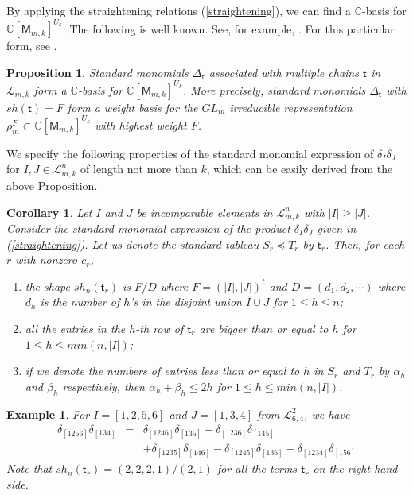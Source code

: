 \documentclass[11pt]{amsart}
\numberwithin{equation}{subsection}
\newtheorem{corollary}[theorem]{Corollary}
\newtheorem{example}[theorem]{Example}
\newtheorem{proposition}[theorem]{Proposition}
\begin{document}
By applying the straightening relations (\ref{straightening}), we can find a 
$\mathbb{C}$-basis for 
$\mathbb{C}[\mathsf{M}_{m,k}]^{U_{k}}$. The following is well known. See, for
example, \cite{BH93,DEP82,GL01,Hod43}. For this particular form, see 
\cite[Theorem 4.5, Remark 4.6]{Ki08}.

\begin{proposition}
Standard monomials $\Delta _{\mathsf{t}}$ associated with multiple chains 
$\mathsf{t}$ in $\mathcal{L}_{m,k}$ form a $\mathbb{C}$-basis for 
$\mathbb{C}[\mathsf{M}_{m,k}]^{U_{k}}$. More precisely, standard monomials 
$\Delta _{\mathsf{t}}$ with $sh(\mathsf{t})=F$ form a weight basis for the 
${GL}_{m}$ irreducible representation 
$\rho _{m}^{F}\subset \mathbb{C}[\mathsf{M}_{m,k}]^{U_{k}}$ with highest weight $F$.
\end{proposition}

\smallskip

We specify the following properties of the standard monomial expression of 
$\delta_I \delta_J$ for $I,J \in \mathcal{L}_{m,k}^n$ of length not more than $k$, 
which can be easily derived from the above Proposition.

\begin{corollary}\label{straightening123} 
Let $I$ and $J$ be incomparable elements in $\mathcal{L}_{m,k}^n$ with $|I| \geq |J|$. Consider the 
standard monomial expression of the product $\delta_I \delta_J$ given in (\ref{straightening}). Let 
us denote the standard tableau $S_r \preceq T_r$ by $\mathsf{t}_r$. Then, for each $r$ with nonzero
$c_r$,
\begin{enumerate}
\item the shape $sh_n(\mathsf{t}_r)$ is $F/D$ where $F=(|I|, |J|)^t$ and 
$D=(d_1, d_2, \cdots)$ where $d_h$ is the number of $h$'s in 
the disjoint union $I \dot{\cup} J$ for $1 \leq h \leq n$;

\item all the entries in the $h$-th row of ${\mathsf{t}_r}$ are bigger than or equal to 
$h$ for $1 \leq h \leq min(n,|I|)$;

\item if we denote the numbers of entries less than or equal to $h$ in $S_r$ and $T_r$ by 
$\alpha_h$ and $\beta_h$ respectively, then $\alpha_{h} + \beta_{h} \leq {2h}$ 
for $1 \leq h \leq min(n,|I|)$.
\end{enumerate}
\end{corollary}

\begin{example}
For $I=[1,2,5,6]$ and $J=[1,3,4]$ from $\mathcal{L}_{6,4}^2$, we have
\begin{eqnarray*}
\delta_{[1256]} \delta_{[134]} &=& \delta_{[1246]} \delta_{[135]}  - \delta_{[1236]} \delta_{[145]}\\
 && + \delta_{[1235]} \delta_{[146]} - \delta_{[1245]} \delta_{[136]} - \delta_{[1234]} \delta_{[156]} 
\end{eqnarray*}
Note that $sh_n(\mathsf{t}_r)=(2,2,2,1)/(2,1)$ for all the terms $\mathsf{t}_r$ 
on the right hand side.
\end{example}
\end{document}
